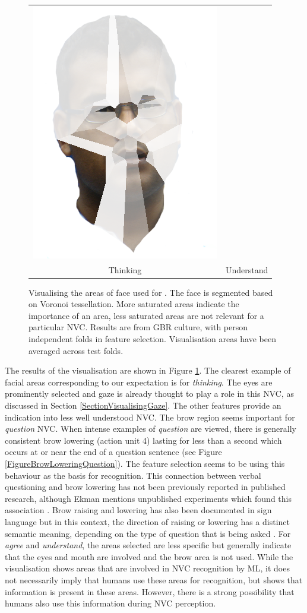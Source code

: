 \begin{figure}[tb]
\begin{tabular}{ cc }
\includegraphics[width = 0.39 \columnwidth]{featureselection/visoutput-understand-crop-bng.png}\\
Thinking & Understand \\
\end{tabular}
\caption[Visualising the areas of face used for \featureGeneration.]{Visualising the areas of face used for \featureGeneration. The face is segmented based on Voronoi tessellation. More saturated areas indicate the importance of an area, less saturated areas are not relevant for a particular \ac{NVC}. Results are from GBR culture, with person independent folds in feature selection. Visualisation areas have been averaged across test folds.}
\label{FigureFeatureSelectionVis}
\end{figure}

The results of the visualisation are shown in Figure \ref{FigureFeatureSelectionVis}. The clearest example of facial areas corresponding to our expectation is for \textit{thinking}. The eyes are prominently selected and gaze is already thought to play a role in this \ac{NVC}, as discussed in Section \ref{SectionVisualisingGaze}. The other features provide an indication into less well understood \ac{NVC}. The brow region seems important for \textit{question} \ac{NVC}. When intense examples of \textit{question} are viewed, there is generally consistent brow lowering (action unit 4) lasting for less than a second which occurs at or near the end of a question sentence (see Figure \ref{FigureBrowLoweringQuestion}). The feature selection seems to be using this behaviour as the basis for recognition. This connection between verbal questioning and brow lowering has not been previously reported in published research, although Ekman mentions unpublished experiments which found this association \cite{Ekman1979}. Brow raising and lowering has also been documented in sign language but in this context, the direction of raising or lowering has a distinct semantic meaning, depending on the type of question that is being asked \cite{Ekman1999}. For \textit{agree} and \textit{understand}, the areas selected are less specific but generally indicate that the eyes and mouth are involved and the brow area is not used. While the visualisation shows areas that are involved in \ac{NVC} recognition by \ac{ML}, it does not necessarily imply that humans use these areas for recognition, but shows that information is present in these areas. However, there is a strong possibility that humans also use this information during \ac{NVC} perception.

